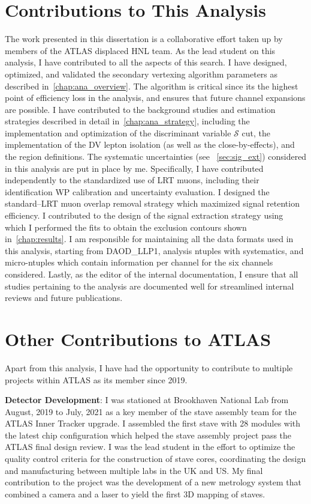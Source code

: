 \section*{Contributions to This Analysis}
The work presented in this dissertation is a collaborative effort taken up by members of the ATLAS displaced HNL team. As the lead student on this analysis, I have contributed to all the aspects of this search. I have designed, optimized, and validated the secondary vertexing algorithm parameters as described in~\cref{chap:ana_overview}. The algorithm is critical since its the highest point of efficiency loss in the analysis, and ensures that future channel expansions are possible. I have contributed to the background studies and estimation strategies described in detail in~\cref{chap:ana_strategy}, including the implementation and optimization of the discriminant variable $\mathcal{S}$ cut, the implementation of the DV lepton isolation (as well as the close-by-effects), and the region definitions. The systematic uncertainties (see ~\cref{sec:sig_ext}) considered in this analysis are put in place by me. Specifically, I have contributed independently to the standardized use of LRT muons, including their identification WP calibration and uncertainty evaluation. I designed the standard--LRT muon overlap removal strategy which maximized signal retention efficiency. I contributed to the design of the signal extraction strategy using which I performed the fits to obtain the exclusion contours shown in~\cref{chap:results}. I am responsible for maintaining all the data formats used in this analysis, starting from DAOD\_LLP1, analysis ntuples with systematics, and micro-ntuples which contain information per channel for the six channels considered. Lastly, as the editor of the internal documentation, I ensure that all studies pertaining to the analysis are documented well for streamlined internal reviews and future publications.

\section*{Other Contributions to ATLAS}
Apart from this analysis, I have had the opportunity to contribute to multiple projects within ATLAS as its member since 2019.

\textbf{Detector Development}: I was stationed at Brookhaven National Lab from August, 2019 to July, 2021 as a key member of the stave assembly team for the ATLAS Inner Tracker upgrade. I assembled the first stave with 28 modules with the latest chip configuration which helped the stave assembly project pass the ATLAS final design review. I was the lead student in the effort to optimize the quality control criteria for the construction of stave cores, coordinating the design and manufacturing between multiple labs in the UK and US. My final contribution to the project was the development of a new metrology system that combined a camera and a laser to yield the first 3D mapping of staves.

